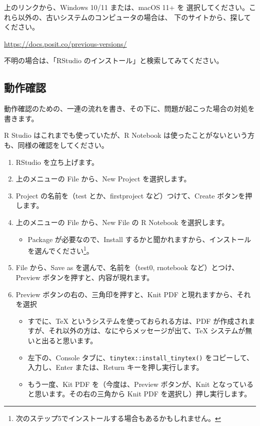 \documentclass[
  xelatex, ja=standard]{bxjsbook}
\providecommand{\tightlist}{%
  \setlength{\itemsep}{0pt}\setlength{\parskip}{0pt}}
\theoremstyle{definition}
\theoremstyle{definition}
\theoremstyle{definition}
\theoremstyle{definition}
\theoremstyle{remark}
\begin{document}
上のリンクから、Windows 10/11 または、macOS 11+ を 選択してください。これら以外の、古いシステムのコンピュータの場合は、 下のサイトから、探してください。

\url{https://docs.posit.co/previous-versions/}

不明の場合は、「RStudio のインストール」と検索してみてください。

\hypertarget{ux52d5ux4f5cux78baux8a8d}{%
\subsection{動作確認}\label{ux52d5ux4f5cux78baux8a8d}}

動作確認のための、一連の流れを書き、その下に、問題が起こった場合の対処を書きます。

R Studio はこれまでも使っていたが、R Notebook は使ったことがないという方も、同様の確認をしてください。

\begin{enumerate}
\def\labelenumi{\arabic{enumi}.}
\tightlist
\item
  RStudio を立ち上げます。
\item
  上のメニューの File から、New Project を選択します。
\item
  Project の名前を（test とか、firstproject など）つけて、Create ボタンを押します。
\item
  上のメニューの File から、New File の R Notebook を選択します。

  \begin{itemize}
  \tightlist
  \item
    Package が必要なので、Install するかと聞かれますから、インストールを選んでください\footnote{次のステップ5でインストールする場合もあるかもしれません。}。
  \end{itemize}
\item
  File から、Save as を選んで、名前を（test0, rnotebook など）とつけ、Preview ボタンを押すと、内容が現れます。
\item
  Preview ボタンの右の、三角印を押すと、Knit PDF と現れますから、それを選択

  \begin{itemize}
  \tightlist
  \item
    すでに、TeX というシステムを使っておられる方は、PDF が作成されますが、それ以外の方は、なにやらメッセージが出て、TeX システムが無いと出ると思います。
  \item
    左下の、Console タブに、\texttt{tinytex::install\_tinytex()} をコピーして、入力し、Enter または、Return キーを押し実行します。
  \item
    もう一度、Kit PDF を（今度は、Preview ボタンが、Knit となっていると思います。その右の三角から Knit PDF を選択し）押し実行します。
  \end{itemize}
\end{enumerate}
\end{document}
